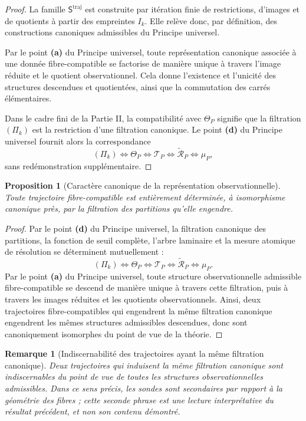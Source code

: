 \documentclass[11pt,a4paper]{article}
\newtheorem{proposition}{Proposition}
\newtheorem{remark}{Remarque}
\begin{document}
\begin{appendices}
\begin{proof}
La famille \(\mathsf S^{\mathrm{traj}}\) est construite par itération finie de restrictions, d'images et de quotients à partir des empreintes \(I_k\). Elle relève donc, par définition, des constructions canoniques admissibles du Principe universel.

Par le point \textbf{(a)} du Principe universel, toute représentation canonique associée à une donnée fibre-compatible se factorise de manière unique à travers l'image réduite et le quotient observationnel. Cela donne l'existence et l'unicité des structures descendues et quotientées, ainsi que la commutation des carrés élémentaires.

Dans le cadre fini de la Partie II, la compatibilité avec \(\Theta_P\) signifie que la filtration \((\Pi_k)\) est la restriction d'une filtration canonique. Le point \textbf{(d)} du Principe universel fournit alors la correspondance
\[
(\Pi_k)\Longleftrightarrow \Theta_P \Longleftrightarrow \mathcal T_P \Longleftrightarrow \widetilde{\mathcal R}_P \Longleftrightarrow \mu_P,
\]
sans redémonstration supplémentaire.
\end{proof}

\begin{proposition}[Caractère canonique de la représentation observationnelle]
Toute trajectoire fibre-compatible est entièrement déterminée, à isomorphisme canonique près, par la filtration des partitions qu'elle engendre.
\end{proposition}

\begin{proof}
Par le point \textbf{(d)} du Principe universel, la filtration canonique des partitions, la fonction de seuil complète, l'arbre laminaire et la mesure atomique de résolution se déterminent mutuellement :
\[
(\Pi_k)\Longleftrightarrow \Theta_P \Longleftrightarrow \mathcal T_P \Longleftrightarrow \widetilde{\mathcal R}_P \Longleftrightarrow \mu_P.
\]
Par le point \textbf{(a)} du Principe universel, toute structure observationnelle admissible fibre-compatible se descend de manière unique à travers cette filtration, puis à travers les images réduites et les quotients observationnels. Ainsi, deux trajectoires fibre-compatibles qui engendrent la même filtration canonique engendrent les mêmes structures admissibles descendues, donc sont canoniquement isomorphes du point de vue de la théorie.
\end{proof}

\begin{remark}[Indiscernabilité des trajectoires ayant la même filtration canonique]
Deux trajectoires qui induisent la même filtration canonique sont indiscernables du point de vue de toutes les structures observationnelles admissibles. Dans ce sens précis, les sondes sont secondaires par rapport à la géométrie des fibres ; cette seconde phrase est une lecture interprétative du résultat précédent, et non son contenu démontré.
\end{remark}


\end{appendices}
\end{document}
